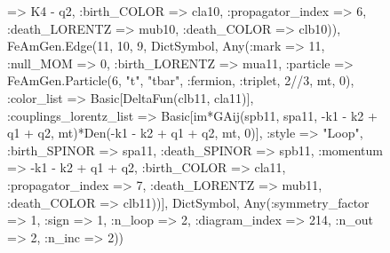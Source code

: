 \documentclass{revtex4}
\begin{document}
\begin{figure}[!htb]
\begin{center}
{=> K4 - q2, :birth_COLOR => cla10, :propagator_index => 6, :death_LORENTZ => mub10, :death_COLOR => clb10)), FeAmGen.Edge(11, 10, 9, Dict{Symbol, Any}(:mark => 11, :null_MOM => 0, :birth_LORENTZ => mua11, :particle => FeAmGen.Particle(6, "t", "tbar", :fermion, :triplet, 2//3, mt, 0), :color_list => Basic[DeltaFun(clb11, cla11)], :couplings_lorentz_list => Basic[im*GAij(spb11, spa11, -k1 - k2 + q1 + q2, mt)*Den(-k1 - k2 + q1 + q2, mt, 0)], :style => "Loop", :birth_SPINOR => spa11, :death_SPINOR => spb11, :momentum => -k1 - k2 + q1 + q2, :birth_COLOR => cla11, :propagator_index => 7, :death_LORENTZ => mub11, :death_COLOR => clb11))], Dict{Symbol, Any}(:symmetry_factor => 1, :sign => 1, :n_loop => 2, :diagram_index => 214, :n_out => 2, :n_inc => 2)) 
}
\end{center}
\end{figure}
\end{document}
